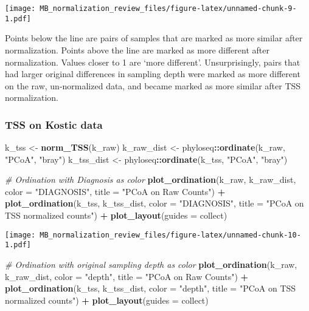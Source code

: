 \documentclass[
]{book}
\newenvironment{Shaded}{\begin{snugshade}}{\end{snugshade}}
\newcommand{\CommentTok}[1]{\textcolor[rgb]{0.56,0.35,0.01}{\textit{#1}}}
\newcommand{\DataTypeTok}[1]{\textcolor[rgb]{0.13,0.29,0.53}{#1}}
\newcommand{\KeywordTok}[1]{\textcolor[rgb]{0.13,0.29,0.53}{\textbf{#1}}}
\newcommand{\NormalTok}[1]{#1}
\newcommand{\OperatorTok}[1]{\textcolor[rgb]{0.81,0.36,0.00}{\textbf{#1}}}
\newcommand{\StringTok}[1]{\textcolor[rgb]{0.31,0.60,0.02}{#1}}
\begin{document}
\texttt{[image: MB\_normalization\_review\_files/figure-latex/unnamed-chunk-9-1.pdf]}

Points below the line are pairs of samples that are marked as more similar after normalization. Points above the line are marked as more different after normalization. Values closer to 1 are `more different'. Unsurprisingly, pairs that had larger original differences in sampling depth were marked as more different on the raw, un-normalized data, and became marked as more similar after TSS normalization.

\hypertarget{tss-on-kostic-data}{%
\subsubsection{TSS on Kostic data}\label{tss-on-kostic-data}}

\begin{Shaded}
\begin{Highlighting}[]
\NormalTok{k\_tss \textless{}{-}}\StringTok{ }\KeywordTok{norm\_TSS}\NormalTok{(k\_raw)}
\NormalTok{k\_raw\_dist \textless{}{-}}\StringTok{ }\NormalTok{phyloseq}\OperatorTok{::}\KeywordTok{ordinate}\NormalTok{(k\_raw, }\StringTok{"PCoA"}\NormalTok{, }\StringTok{"bray"}\NormalTok{)}
\NormalTok{k\_tss\_dist \textless{}{-}}\StringTok{ }\NormalTok{phyloseq}\OperatorTok{::}\KeywordTok{ordinate}\NormalTok{(k\_tss, }\StringTok{"PCoA"}\NormalTok{, }\StringTok{"bray"}\NormalTok{)}

\CommentTok{\# Ordination with Diagnosis as color }
\KeywordTok{plot\_ordination}\NormalTok{(k\_raw, k\_raw\_dist, }\DataTypeTok{color =} \StringTok{"DIAGNOSIS"}\NormalTok{, }
                \DataTypeTok{title =} \StringTok{"PCoA on Raw Counts"}\NormalTok{) }\OperatorTok{+}\StringTok{ }
\KeywordTok{plot\_ordination}\NormalTok{(k\_tss, k\_tss\_dist, }\DataTypeTok{color =} \StringTok{"DIAGNOSIS"}\NormalTok{, }
                \DataTypeTok{title =} \StringTok{"PCoA on TSS normalized counts"}\NormalTok{) }\OperatorTok{+}
\StringTok{  }\KeywordTok{plot\_layout}\NormalTok{(}\DataTypeTok{guides =} \StringTok{\textquotesingle{}collect\textquotesingle{}}\NormalTok{)}
\end{Highlighting}
\end{Shaded}

\texttt{[image: MB\_normalization\_review\_files/figure-latex/unnamed-chunk-10-1.pdf]}

\begin{Shaded}
\begin{Highlighting}[]
\CommentTok{\# Ordination with original sampling depth as color}
\KeywordTok{plot\_ordination}\NormalTok{(k\_raw, k\_raw\_dist, }\DataTypeTok{color =} \StringTok{"depth"}\NormalTok{, }
                \DataTypeTok{title =} \StringTok{"PCoA on Raw Counts"}\NormalTok{) }\OperatorTok{+}\StringTok{ }
\KeywordTok{plot\_ordination}\NormalTok{(k\_tss, k\_tss\_dist, }\DataTypeTok{color =} \StringTok{"depth"}\NormalTok{, }
                \DataTypeTok{title =} \StringTok{"PCoA on TSS normalized counts"}\NormalTok{) }\OperatorTok{+}
\StringTok{  }\KeywordTok{plot\_layout}\NormalTok{(}\DataTypeTok{guides =} \StringTok{\textquotesingle{}collect\textquotesingle{}}\NormalTok{)}
\end{Highlighting}
\end{Shaded}
\end{document}
